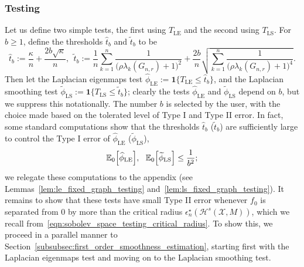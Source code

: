 \documentclass{article}
\newcommand{\1}{\mathbf{1}}
\newcommand{\Xset}{\mathcal{X}}
\newcommand{\mc}[1]{\mathcal{#1}}
\newcommand{\Ebb}{\mathbb{E}}
\newcommand{\wt}[1]{\widetilde{#1}}
\newcommand{\wh}[1]{\widehat{#1}}
\newcommand{\LE}{\mathrm{LE}}
\newcommand{\LS}{\mathrm{LS}}
\theoremstyle{alden}
\theoremstyle{aldenthm}
\theoremstyle{definition}
\theoremstyle{remark}
\begin{document}
\subsubsection{Testing}
Let us define two simple tests, the first using $T_{\LE}$ and the second using $T_{\LS}$. For $b \geq 1$, define the thresholds $\wh{t}_b$ and $\wt{t}_b$ to be
\begin{equation*}
\wh{t}_{b} := \frac{\kappa}{n} + \frac{2b\sqrt{\kappa}}{n},~~ \wt{t}_{b} := \frac{1}{n}\sum_{k = 1}^{n} \frac{1}{\bigl(\rho \lambda_k(G_{n,r}) + 1\bigr)^2} + \frac{2b}{n}\sqrt{\sum_{k = 1}^{n} \frac{1}{\bigl(\rho \lambda_k(G_{n,r}) + 1\bigr)^4}}.
\end{equation*}
Then let the Laplacian eigenmaps test $\wh{\phi}_{\LE} := \1\bigl\{T_{\LE} \leq \wh{t}_b\bigr\}$, and the Laplacian smoothing test $\wt{\phi}_{\LS} := \1\bigl\{T_{\LS} \leq \wt{t}_b\bigr\}$; clearly the tests $\wh{\phi}_{\LE}$ and $\wt{\phi}_{\LS}$ depend on $b$, but we suppress this notationally. The number $b$ is selected by the user, with the choice made based on the tolerated level of Type I and Type II error. In fact, some standard computations show that the thresholds $\wh{t}_b$ ($\wt{t}_b$) are sufficiently large to control the Type I error of $\wh{\phi}_{\LE}$ ($\wt{\phi}_{\LS}$), 
\begin{equation*}
\Ebb_0\Bigl[\wh{\phi}_{\LE}\Bigr],~~\Ebb_0\Bigl[\wt{\phi}_{\LS}\Bigr] \leq \frac{1}{b^2};
\end{equation*}
we relegate these computations to the appendix (see Lemmas~\ref{lem:le_fixed_graph_testing} and~\ref{lem:ls_fixed_graph_testing}). It remains to show that these tests have small Type II error whenever $f_0$ is separated from $0$ by more than the critical radius $\epsilon_n^{\star}(\mc{H}^s(\Xset,M))$, which we recall from~\eqref{eqn:sobolev_space_testing_critical_radius}. To show this, we proceed in a parallel manner to Section~\ref{subsubsec:first_order_smoothness_estimation}, starting first with the Laplacian eigenmaps test and moving on to the Laplacian smoothing test. 
\end{document}
